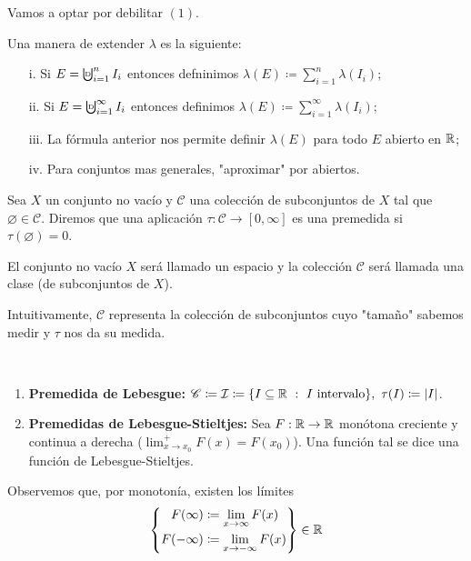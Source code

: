 \noindent Vamos a optar por debilitar $(1)$. \par
\medskip
\noindent Una manera de extender $\lambda$ es la siguiente:
\begin{enumerate}
	\item[i.] Si $E = \textbigcupd_{i=1}^{n} I_i$ entonces defninimos $\lambda(E) \coloneq \sum_{i=1}^{n} \lambda (I_i)$;

	\item[ii.] Si $E = \textbigcupd_{i=1}^{\infty} I_i$ entonces definimos $\lambda(E) \coloneq \sum_{i=1}^{\infty} \lambda (I_i)$;

	\item[iii.] La fórmula anterior nos permite definir $\lambda (E)$ para todo $E$ abierto en $\mathbb{R}$;

	\item[iv.] Para conjuntos mas generales, "aproximar" por abiertos. 
\end{enumerate}

\begin{definition}[premedida]
	Sea $X$ un conjunto no vacío y $\mathscr{C}$ una colección de subconjuntos de $X$ tal que $\varnothing \in \mathscr{C}$. Diremos que una aplicación $\tau : \mathscr{C} \to [0,\infty]$ es una premedida si $\tau (\varnothing)=0$.
\end{definition}
\medskip
\begin{remark}
	El conjunto no vacío $X$ será llamado un espacio y la colección $\mathscr{C}$ será llamada una clase (de subconjuntos de $X$).
\end{remark}
\smallskip
\noindent Intuitivamente, $\mathscr{C}$ representa la colección de subconjuntos cuyo "tamaño" sabemos medir y $\tau$ nos da su medida.

\begin{eg}~
	\begin{enumerate}
		\item \textbf{Premedida de Lebesgue:} $\mathscr{C} \coloneq \mathcal{I} \coloneq \{ I \subseteq \mathbb{R} \ : \ I \text{ intervalo}\}, \ \tau(I) \coloneq |I|$.

		\item \textbf{Premedidas de Lebesgue-Stieltjes:} Sea $F:\mathbb{R} \to \mathbb{R}$ monótona creciente y continua a derecha ($\lim_{x \to x_0}^{+} F(x) = F(x_0)$). Una función tal se dice una función de Lebesgue-Stieltjes. 
	\end{enumerate}
\end{eg}
\noindent Observemos que, por monotonía, existen los límites \[ \left\{ \begin{aligned}
	F(\infty) & \coloneq \lim_{x \to \infty} F(x) \\ 
	F(-\infty) & \coloneq \lim_{x \to -\infty} F(x) 
\end{aligned} \right\} \in \mathbb{R} \]

